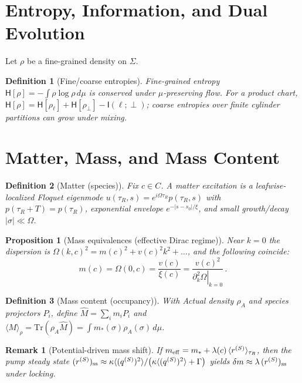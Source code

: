 \documentclass[11pt]{article}
\newtheorem{definition}{Definition}
\newtheorem{proposition}{Proposition}
\newtheorem{remark}{Remark}
\begin{document}
\section{Entropy, Information, and Dual Evolution}
Let $\rho$ be a fine-grained density on $\Sigma$.
\begin{definition}[Fine/coarse entropies]
Fine-grained entropy $\mathsf H[\rho]=-\int\rho\log\rho\,d\mu$ is conserved under $\mu$-preserving flow. For a product chart, $\mathsf H[\rho]=\mathsf H[\rho_\ell]+\mathsf H[\rho_\perp]-\mathsf I(\ell;\perp)$; coarse entropies over finite cylinder partitions can grow under mixing.
\end{definition}

\section{Matter, Mass, and Mass Content}
\begin{definition}[Matter (species)]
Fix $c\in C$. A \emph{matter excitation} is a leafwise-localized Floquet eigenmode $u(\tau_R,s)=e^{i\Omega\tau_R}p(\tau_R,s)$ with $p(\tau_R{+}T)=p(\tau_R)$, exponential envelope $e^{-|s-s_0|/\xi}$, and small growth/decay $|\sigma|\ll\Omega$.
\end{definition}

\begin{proposition}[Mass equivalences (effective Dirac regime)]
Near $k=0$ the dispersion is $\Omega(k,c)^2=m(c)^2+v(c)^2 k^2+\dots$, and the following coincide:
\begin{equation}
m(c)=\Omega(0,c)=\frac{v(c)}{\xi(c)}=\frac{v(c)^2}{\left.\partial_k^2\Omega\right|_{k=0}}\,.
\end{equation}
\end{proposition}

\begin{definition}[Mass content (occupancy)]
With Actual density $\rho_A$ and species projectors $P_i$, define $\widehat M=\sum_i m_i P_i$ and $\langle M\rangle_\rho=\mathrm{Tr}(\rho_A\widehat M)=\int m_\ast(\sigma)\rho_A(\sigma)\,d\mu$.
\end{definition}

\begin{remark}[Potential-driven mass shift]
If $m_{\rm eff}=m_\ast+\lambda(c)\,\langle r^{(S)}\rangle_{\tau_R}$, then the pump steady state $(r^{(S)})_{\rm ss}\approx \kappa\langle (q^{(S)})^2\rangle/\big(\kappa\langle (q^{(S)})^2\rangle+\Gamma\big)$ yields $\delta m\approx \lambda\, (r^{(S)})_{\rm ss}$ under locking.
\end{remark}
\end{document}
